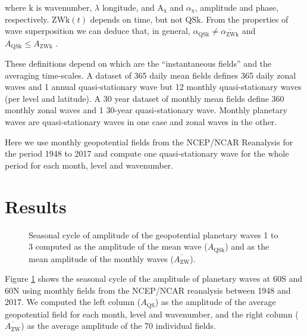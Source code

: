 \documentclass[draft,linenumbers]{agujournal2018}
\begin{document}
where \(\mathrm{k}\) is wavenumber, \(\lambda\) longitude, and
\(\mathrm{A_{x}}\) and \(\alpha_\mathrm{x}\), amplitude and phase,
respectively. \(\mathrm{ZWk}(t)\) depends on time, but not
\(\mathrm{QSk}\). From the properties of wave superposition we can
deduce that, in general,
\(\alpha_\mathrm{QSk} \ne \overline{\alpha_\mathrm{ZWk}}\) and
\(A_\mathrm{QSk} \le \overline{A_\mathrm{ZWk}}\) \citep{Pain2005}.

These definitions depend on which are the ``instantaneous fields'' and
the averaging time-scales. A dataset of 365 daily mean fields defines
365 daily zonal waves and 1 annual quasi-stationary wave but 12 monthly
quasi-stationary waves (per level and latitude). A 30 year dataset of
monthly mean fields define 360 monthly zonal waves and 1 30-year
quasi-stationary wave. Monthly planetary waves are quasi-stationary
waves in one case and zonal waves in the other.

Here we use monthly geopotential fields from the NCEP/NCAR Reanalysis
\citep{Kalnay1996} for the period 1948 to 2017 and compute one
quasi-stationary wave for the whole period for each month, level and
wavenumber.

\section{Results}

\begin{figure}[h]

{\centering {}\newline{}

}

\caption{Seasonal cycle of amplitude of the geopotential planetary waves 1 to 3 computed as the amplitude of the mean wave ($A_\mathrm{QSk}$) and as the mean amplitude of the monthly waves ($\overline{A_\mathrm{ZW} }$).}\label{fig:rao}
\end{figure}

Figure \ref{fig:rao} shows the seasonal cycle of the amplitude of
planetary waves at 60\degree S and 60\degree N using monthly fields from
the NCEP/NCAR reanalysis \citep{Kalnay1996} between 1948 and 2017. We
computed the left column (\(A_\mathrm{QS}\)) as the amplitude of the
average geopotential field for each month, level and wavenumber, and the
right column (\(\overline{A_\mathrm{ZW}}\)) as the average amplitude of
the 70 individual fields.
\end{document}
